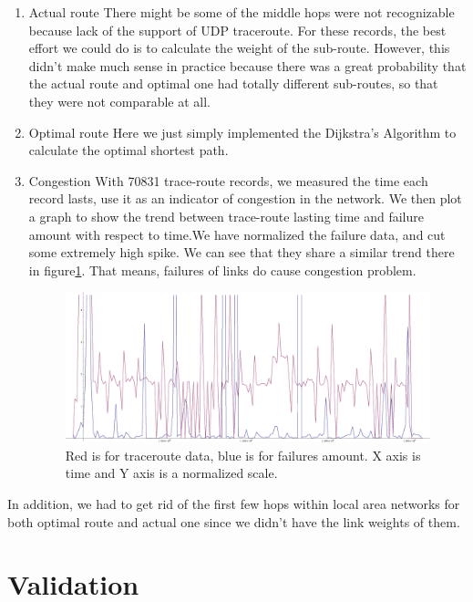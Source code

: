 \documentclass[conference, twocolumn, oneside, 10pt]{IEEEtran}
\begin{document}
\begin{enumerate}

\item{Actual route} There might be some of the middle hops were not recognizable because lack of the support of UDP traceroute. For these records, the best effort we could do is to calculate the weight of the sub-route. However, this didn't make much sense in practice because there was a great probability that the actual route and optimal one had totally different sub-routes, so that they were not comparable at all.

\item{Optimal route} Here we just simply implemented the Dijkstra's Algorithm to calculate the optimal shortest path.

\item{Congestion} With 70831 trace-route records, we measured the time each
  record lasts, use it as an indicator of congestion in the network. We then
  plot a graph to show the trend between trace-route lasting time and failure
  amount with respect to time.We have normalized the failure data, and cut some extremely high spike.
  We can see that they share a similar trend there in figure\ref{fig:TraceToFailure}. That
  means, failures of links do cause congestion problem.

\begin{figure}[h!]
\centering
\includegraphics[scale=0.3]{plot/TraceToFailure.eps}
\caption{Red is for traceroute data, blue is for failures amount. X axis is time
and Y axis is a normalized scale.}
\label{fig:TraceToFailure}
\end{figure}

\end{enumerate}

In addition, we had to get rid of the first few hops within local area networks for both optimal route and actual one since we didn't have the link weights of them.

\section{Validation}
\label{sec:sec5}
\end{document}
